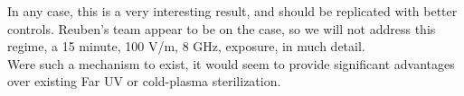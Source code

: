 \documentclass[paper.tex]{subfiles}
\begin{document}
\begin{multicols}{1}
In any case, this is a very interesting result, and should be replicated with better controls. Reuben's team appear to be on the case, so we will not address this regime, a 15 minute, 100 V/m, 8 GHz, exposure, in much detail.\\

Were such a mechanism to exist, it would seem to provide significant advantages over existing Far UV or cold-plasma sterilization.





%
%
%
%
%
%
%
%
%
%
%
%
%
%
%

\end{multicols}
\end{document}
